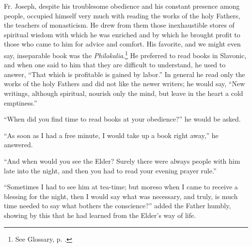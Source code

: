 Fr. Joseph, despite his troublesome obedience and his constant presence among people, occupied himself very much with reading the works of the holy Fathers, the teachers of monasticism. He drew from them those inexhaustible stores of spiritual wisdom with which he was enriched and by which he brought profit to those who came to him for advice and comfort. His favorite, and we might even say, inseparable book was the \textit{Philokalia}.\footnote{See Glossary, p. \pageref{Philokalia}.} He preferred to read books in Slavonic, and when one said to him that they are difficult to understand, he used to answer, ``That which is profitable is gained by labor.'' In general he read only the works of the holy Fathers and did not like the newer writers; he would say, ``New writings, although spiritual, nourish only the mind, but leave in the heart a cold emptiness.''

``When did you find time to read books at your obedience?'' he would be asked.

``As soon as I had a free minute, I would take up a book right away,'' he answered.

``And when would you see the Elder? Surely there were always people with him late into the night, and then you had to read your evening prayer rule.''

``Sometimes I had to see him at tea-time; but moreso when I came to receive a blessing for the night, then I would say what was necessary, and truly, is much time needed to say what bothers the conscience?'' added the Father humbly, showing by this that he had learned from the Elder's way of life.

